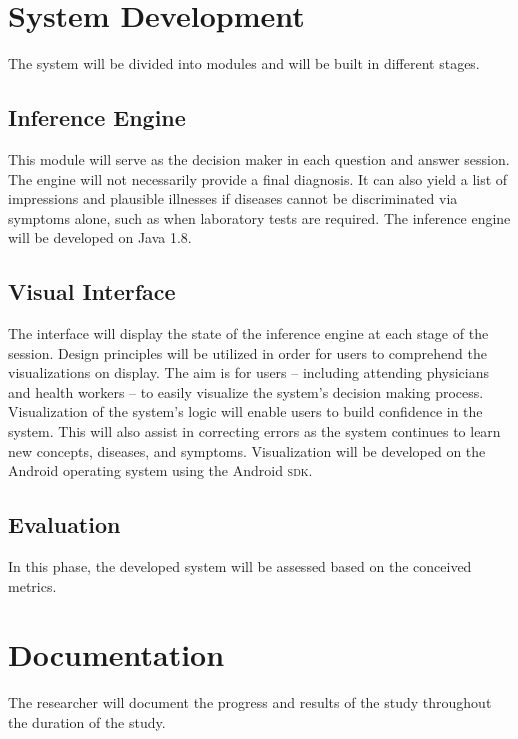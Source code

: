 \section{System Development}
The system will be divided into modules and will be built in different stages. 

\subsection{Inference Engine}
This module will serve as the decision maker in each question and answer session.
The engine will not necessarily provide a final diagnosis.
It can also yield a list of impressions and plausible illnesses if diseases cannot be discriminated via symptoms alone, such as when laboratory tests are required.
The inference engine will be developed on Java 1.8.

\subsection{Visual Interface}
The interface will display the state of the inference engine at each stage of the session.
Design principles will be utilized in order for users to comprehend the visualizations on display.
The aim is for users -- including attending physicians and health workers -- to easily visualize the system's decision making process.
Visualization of the system's logic will enable users to build confidence in the system.
This will also assist in correcting errors as the system continues to learn new concepts, diseases, and symptoms.
Visualization will be developed on the Android operating system using the Android \textsc{sdk}.

\subsection{Evaluation}
In this phase, the developed system will be assessed based on the conceived metrics.
 
\section{Documentation}
The researcher will document the progress and results of the study throughout the duration of the study. 

\newpage

